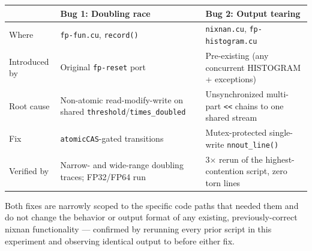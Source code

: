 \documentclass[11pt]{article}
\begin{document}
\begin{center}
\begin{tabular}{p{3.7cm}p{4.3cm}p{4.3cm}}
\toprule
& Bug 1: Doubling race & Bug 2: Output tearing \\
\midrule
Where & \texttt{fp-fun.cu}, \texttt{record()} & \texttt{nixnan.cu}, \texttt{fp-histogram.cu} \\
Introduced by & Original \texttt{fp-reset} port & Pre-existing (any concurrent HISTOGRAM + exceptions) \\
Root cause & Non-atomic read-modify-write on shared \texttt{threshold}/\texttt{times\_doubled} & Unsynchronized multi-part \texttt{<<} chains to one shared stream \\
Fix & \texttt{atomicCAS}-gated transitions & Mutex-protected single-write \texttt{nnout\_line()} \\
Verified by & Narrow- and wide-range doubling traces; FP32/FP64 run & 3$\times$ rerun of the highest-contention script, zero torn lines \\
\bottomrule
\end{tabular}
\end{center}

Both fixes are narrowly scoped to the specific code paths that needed them and do not
change the behavior or output format of any existing, previously-correct nixnan
functionality --- confirmed by rerunning every prior script in this experiment and
observing identical output to before either fix.
\end{document}
